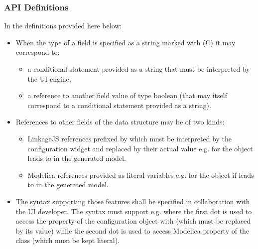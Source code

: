 \documentclass[letterpaper,10pt, openany,english]{sphinxmanual}
\begin{document}
\subsubsection{API Definitions}
\label{\detokenize{requirements:api-definitions}}
In the definitions provided here below:
\begin{itemize}
\item {} 
When the type of a field is specified as a string marked with (C) it may correspond to:
\begin{itemize}
\item {} 
a conditional statement provided as a string that must be interpreted by the UI engine,

\item {} 
a reference to another field value of type boolean (that may itself correspond to a conditional statement provided as a string).

\end{itemize}

\item {} 
References to other fields of the data structure may be of two kinds:
\begin{itemize}
\item {} 
LinkageJS references prefixed by \sphinxcode{\sphinxupquote{\#}} which must be interpreted by the configuration widget and replaced by their actual value e.g.  for the object  leads to  in the generated model.

\item {} 
Modelica references provided as literal variables e.g.  for the object if  leads to  in the generated model.

\end{itemize}

\item {} 
The syntax supporting those features shall be specified in collaboration with the UI developer. The syntax must support e.g.  where the first dot is used to access the property  of the configuration object with  (which must be replaced by its value) while the second dot is used to access Modelica property  of the class  (which must be kept literal).

\end{itemize}
\end{document}
